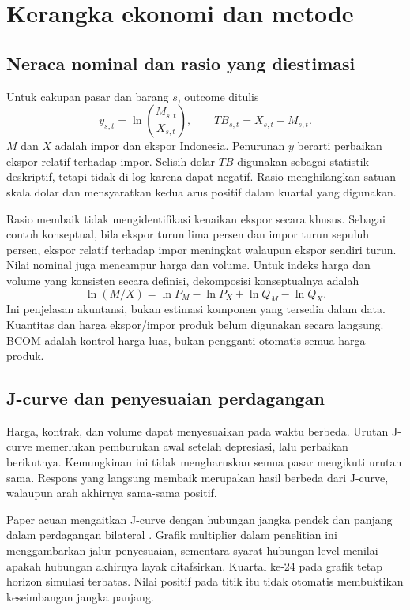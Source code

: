 \section{Kerangka ekonomi dan metode}\label{sec:methods}
\subsection{Neraca nominal dan rasio yang diestimasi}
Untuk cakupan pasar dan barang $s$, outcome ditulis
\begin{equation}
 y_{s,t}=\ln\left(\frac{M_{s,t}}{X_{s,t}}\right),
 \qquad TB_{s,t}=X_{s,t}-M_{s,t}.\label{eq:outcome}
\end{equation}
$M$ dan $X$ adalah impor dan ekspor Indonesia. Penurunan $y$ berarti perbaikan ekspor relatif terhadap impor. Selisih dolar $TB$ digunakan sebagai statistik deskriptif, tetapi tidak di-log karena dapat negatif. Rasio menghilangkan satuan skala dolar dan mensyaratkan kedua arus positif dalam kuartal yang digunakan.

Rasio membaik tidak mengidentifikasi kenaikan ekspor secara khusus. Sebagai contoh konseptual, bila ekspor turun lima persen dan impor turun sepuluh persen, ekspor relatif terhadap impor meningkat walaupun ekspor sendiri turun. Nilai nominal juga mencampur harga dan volume. Untuk indeks harga dan volume yang konsisten secara definisi, dekomposisi konseptualnya adalah
\begin{equation}
 \ln(M/X)=\ln P_M-\ln P_X+\ln Q_M-\ln Q_X.\label{eq:value}
\end{equation}
Ini penjelasan akuntansi, bukan estimasi komponen yang tersedia dalam data. Kuantitas dan harga ekspor/impor produk belum digunakan secara langsung. BCOM adalah kontrol harga luas, bukan pengganti otomatis semua harga produk.

\subsection{J-curve dan penyesuaian perdagangan}
Harga, kontrak, dan volume dapat menyesuaikan pada waktu berbeda. Urutan J-curve memerlukan pemburukan awal setelah depresiasi, lalu perbaikan berikutnya. Kemungkinan ini tidak mengharuskan semua pasar mengikuti urutan sama. Respons yang langsung membaik merupakan hasil berbeda dari J-curve, walaupun arah akhirnya sama-sama positif.

Paper acuan mengaitkan J-curve dengan hubungan jangka pendek dan panjang dalam perdagangan bilateral \cite{bahmani}. Grafik multiplier dalam penelitian ini menggambarkan jalur penyesuaian, sementara syarat hubungan level menilai apakah hubungan akhirnya layak ditafsirkan. Kuartal ke-24 pada grafik tetap horizon simulasi terbatas. Nilai positif pada titik itu tidak otomatis membuktikan keseimbangan jangka panjang.

